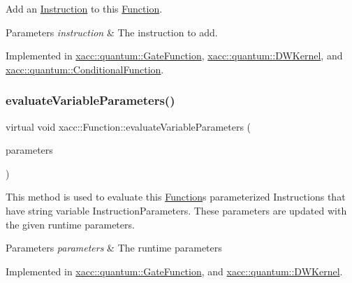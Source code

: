 Add an \hyperlink{a01155}{Instruction} to this \hyperlink{a01151}{Function}.


\begin{DoxyParams}{Parameters}
{\em instruction} & The instruction to add. \\
\hline
\end{DoxyParams}


Implemented in \hyperlink{a01011_a892fb69a10f0a7cb5abdab4cca61b80a}{xacc\+::quantum\+::\+Gate\+Function}, \hyperlink{a00983_a4c3043d6971999c3a09e797fc55deb6c}{xacc\+::quantum\+::\+D\+W\+Kernel}, and \hyperlink{a01035_a6aedad20f96390880efdc0a476b3273f}{xacc\+::quantum\+::\+Conditional\+Function}.

\mbox{\label{a01151_af6ae9453027789a2aaec30e59c9e45e3}} 
\subsubsection{\texorpdfstring{evaluate\+Variable\+Parameters()}{evaluateVariableParameters()}}
{\footnotesize\ttfamily virtual void xacc\+::\+Function\+::evaluate\+Variable\+Parameters (\begin{DoxyParamCaption}\item[{std\+::vector$<$ Instruction\+Parameter $>$}]{parameters }\end{DoxyParamCaption})\hspace{0.3cm}{\ttfamily [pure virtual]}}

This method is used to evaluate this \hyperlink{a01151}{Function}\textquotesingle{}s parameterized Instructions that have string variable Instruction\+Parameters. These parameters are updated with the given runtime parameters.


\begin{DoxyParams}{Parameters}
{\em parameters} & The runtime parameters \\
\hline
\end{DoxyParams}


Implemented in \hyperlink{a01011_a4bcbd2c8c4b615d74e4a4d39952fd411}{xacc\+::quantum\+::\+Gate\+Function}, and \hyperlink{a00983_a09ffac417d4ecbbd82d7a680ad8dfcce}{xacc\+::quantum\+::\+D\+W\+Kernel}.

\mbox{\label{a01151_afa549fc91b5a05f26d8139954a7e0ed5}} 
